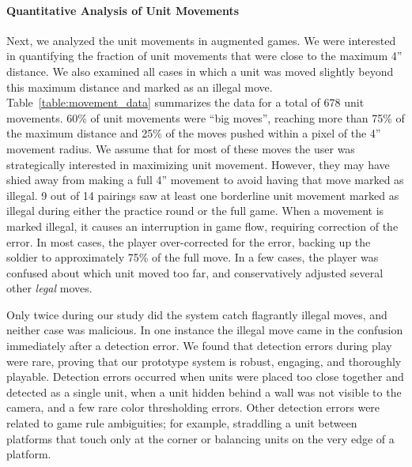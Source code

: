 \documentclass[10pt,twocolumn,letterpaper]{article}
\begin{document}
\vspace{-0.15in}
\paragraph{Quantitative Analysis of Unit Movements}



Next, we analyzed the unit movements in augmented games.  We
were interested in quantifying the fraction of unit movements that
were close to the maximum 4'' distance.  We also examined
all cases in which a unit was moved slightly beyond this maximum distance
and marked as an illegal move.  Table~\ref{table:movement_data}
summarizes the data for a total of 678 unit movements.
%
60\% of unit movements were ``big moves'', reaching more than 75\% of
the maximum distance and 25\% of the moves pushed within a pixel of
the 4'' movement radius.  We assume that for most of these moves the
user was strategically interested in maximizing unit movement.
However, they may have shied away from making a full 4'' movement to
avoid having that move marked as illegal.  9 out of 14 pairings saw
at least one borderline unit movement marked as illegal during either
the practice round or the full game.  When a movement
is marked illegal,
it causes an interruption in game flow, requiring correction of the
error.  In most cases, the player over-corrected for the error,
backing up the soldier to approximately 75\% of the full move.  In a
few cases, the player was confused about which unit moved too far, and
conservatively adjusted several other {\em legal} moves.

Only twice during our study did the system catch flagrantly
illegal moves, and neither case was malicious.  In one instance the
illegal move came in the confusion immediately after a detection
error.  We found that detection errors during play were rare,
proving that our prototype system is robust, engaging, and thoroughly
playable.  Detection errors occurred when units were placed too
close together and detected as a single unit,
when a unit hidden behind a wall was not visible to the camera,
and a few rare color thresholding errors.
Other detection errors were related to game rule ambiguities; for
example, straddling a unit between platforms that touch only at the
corner or balancing units on the very edge of a platform.
\end{document}
